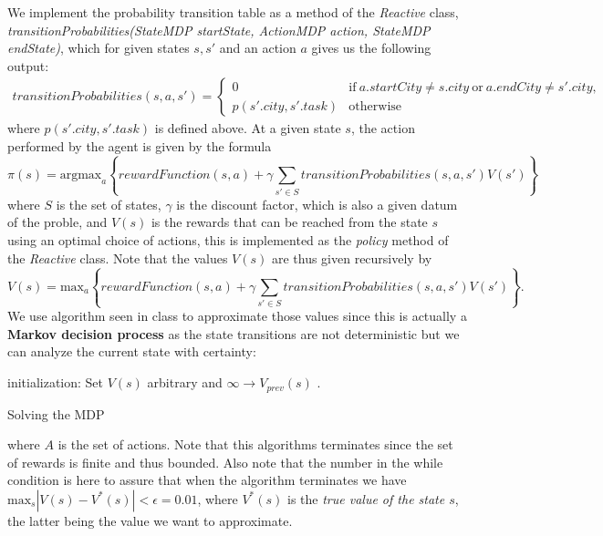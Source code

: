 \documentclass[11pt]{article}
\begin{document}
We implement the probability transition table as a method of the \emph{Reactive} class, \emph{transitionProbabilities(StateMDP startState, ActionMDP action, StateMDP endState)}, which for given states $s,s'$ and an action $a$ gives us the following output:
	\begin{align*}
		transitionProbabilities(s,a,s')=
			\begin{cases}
				0 & \mathrm{if}\ a.startCity\neq s.city\ \mathrm{or}\ a.endCity\neq s'.city,\\
				p(s'.city,s'.task) & \mathrm{otherwise}
			\end{cases}
	\end{align*}
where $p(s'.city,s'.task)$ is defined above.
At a given state $s$, the action performed by the agent is given by the formula $$\pi(s)=\mathrm{argmax}_a\left\{rewardFunction(s,a)+\gamma\sum\limits_{s'\in S}transitionProbabilities(s,a,s')V(s')\right\}$$ where $S$ is the set of states, $\gamma$ is the discount factor, which is also a given datum of the proble, and $V(s)$ is the rewards that can be reached from the state $s$ using an optimal choice of actions, this is implemented as the \emph{policy} method of the \emph{Reactive} class. Note that the values $V(s)$ are thus given recursively by $$V(s) = \mathrm{max}_a\left\{rewardFunction(s,a)+\gamma\sum\limits_{s'\in S}transitionProbabilities(s,a,s')V(s')\right\}.$$ We use algorithm seen in class to approximate those values since this is actually a \textbf{Markov decision process} as the state transitions are not deterministic but we can analyze the current state with certainty:
	\begin{algorithm}[H]
		\SetAlgoLined
	 	initialization: Set $V(s)$ arbitrary and $\infty \rightarrow V_{prev}(s)$ .\\	
		\caption{Solving the MDP}
	\end{algorithm}
where $A$ is the set of actions. Note that this algorithms terminates since the set of rewards is finite and thus bounded. Also note that the number in the while condition is here to assure that when the algorithm terminates we have $\mathrm{max}_s|V(s)-V^*(s)| < \epsilon = 0.01$, where $V^*(s)$ is the \emph{true value of the state $s$}, the latter being the value we want to approximate.
\end{document}
